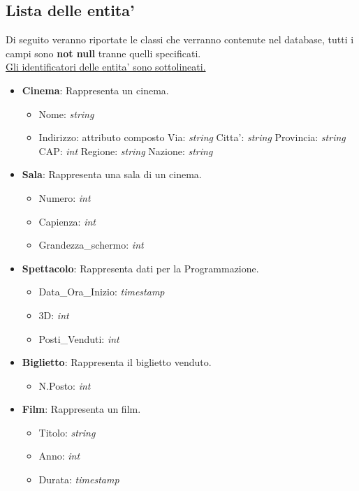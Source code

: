\documentclass[10pt]{article}
\begin{document}
	\subsection{Lista delle entita'}
	Di seguito veranno riportate le classi che verranno contenute nel database, tutti i campi sono \textbf{not null} tranne quelli specificati.\\
	\underline{Gli identificatori delle entita' sono sottolineati.}
	\begin{itemize}
		\item \textbf{Cinema}: Rappresenta un cinema.
		\begin{itemize}
			\item Nome: \textit{string}
			\item Indirizzo: attributo composto
				\subitem Via: \textit{string}
				\subitem Citta': \textit{string}
				\subitem Provincia: \textit{string}
				\subitem CAP: \textit{int}
				\subitem Regione: \textit{string}
				\subitem Nazione: \textit{string}			
		\end{itemize}
		\item \textbf{Sala}: Rappresenta una sala di un cinema.
		\begin{itemize}
		    \item Numero: \textit{int}
			\item Capienza: \textit{int}
			\item Grandezza\_schermo: \textit{int}
		\end{itemize}
		\item \textbf{Spettacolo}: Rappresenta dati per la Programmazione.
		\begin{itemize}
			\item Data\_Ora\_Inizio: \textit{timestamp}
			\item 3D: \textit{int}
			\item Posti\_Venduti: \textit{int}
		\end{itemize}
		\item \textbf{Biglietto}: Rappresenta il biglietto venduto.
		\begin{itemize}
			\item {N.Posto: \textit{int}}
		\end{itemize}
		\item \textbf{Film}: Rappresenta un film.
		\begin{itemize}
			\item Titolo: \textit{string}
			\item Anno: \textit{int}
			\item Durata: \textit{timestamp}

\end{itemize}
\end{itemize}
\end{document}
